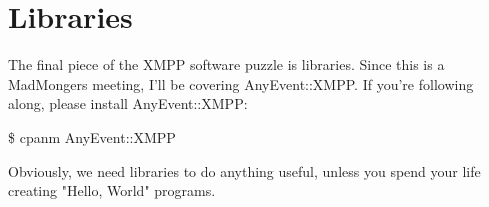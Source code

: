 \section{Libraries}

\pause
The final piece of the XMPP software puzzle is libraries.  Since this is a MadMongers meeting, I'll be covering AnyEvent::XMPP.
If you're following along, please install AnyEvent::XMPP:

\begin{shaded}
\$ cpanm AnyEvent::XMPP
\end{shaded}

\pause

Obviously, we need libraries to do anything useful, unless you spend your life creating "Hello, World" programs.
